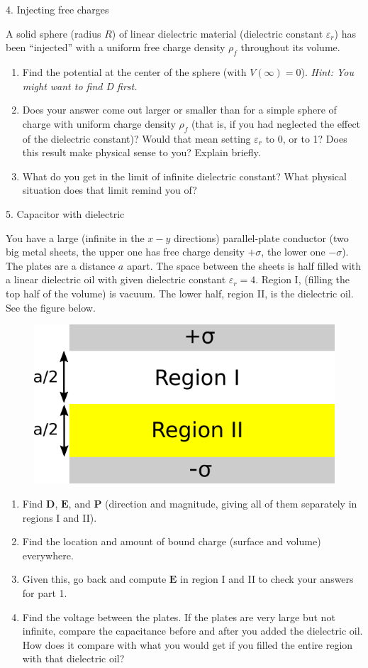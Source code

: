 \documentclass[11pt]{article}
\def\tightlist{}
\begin{document}
{\Large 4. Injecting free charges}\label{injecting-free-charges}

A solid sphere (radius \(R\)) of linear dielectric material (dielectric
constant \(\varepsilon_r\)) has been ``injected'' with a uniform free
charge density \(\rho_f\) throughout its volume.

\begin{enumerate}
\def\labelenumi{\arabic{enumi}.}
\tightlist
\item
  Find the potential at the center of the sphere (with \(V(\infty)=0\)).
  \emph{Hint: You might want to find D first.}
\item
  Does your answer come out larger or smaller than for a simple sphere
  of charge with uniform charge density \(\rho_f\) (that is, if you had
  neglected the effect of the dielectric constant)? Would that mean
  setting \(\varepsilon_r\) to 0, or to 1? Does this result make
  physical sense to you? Explain briefly.
\item
  What do you get in the limit of infinite dielectric constant? What
  physical situation does that limit remind you of?
\end{enumerate}

{\Large 5. Capacitor with
dielectric}\label{capacitor-with-dielectric}

You have a large (infinite in the \(x-y\) directions) parallel-plate
conductor (two big metal sheets, the upper one has free charge density
\(+\sigma\), the lower one \(-\sigma\)). The plates are a distance \(a\)
apart. The space between the sheets is half filled with a linear
dielectric oil with given dielectric constant \(\varepsilon_r = 4\).
Region I, (filling the top half of the volume) is vacuum. The lower
half, region II, is the dielectric oil. See the figure below.

\begin{figure}[htbp]
\centering
\includegraphics[width=0.4\linewidth]{./images/hw8/cap_w_dielectric.png}
\end{figure}

\begin{enumerate}
\def\labelenumi{\arabic{enumi}.}
\tightlist
\item
  Find \(\mathbf{D}\), \(\mathbf{E}\), and \(\mathbf{P}\) (direction and
  magnitude, giving all of them separately in regions I and II).
\item
  Find the location and amount of bound charge (surface and volume)
  everywhere.
\item
  Given this, go back and compute \(\mathbf{E}\) in region I and II to
  check your answers for part 1.
\item
  Find the voltage between the plates. If the plates are very large but
  not infinite, compare the capacitance before and after you added the
  dielectric oil. How does it compare with what you would get if you
  filled the entire region with that dielectric oil?
\end{enumerate}
\end{document}
